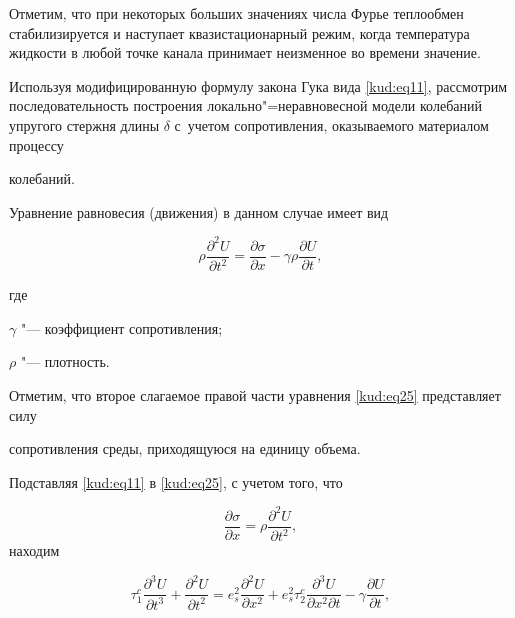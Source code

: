 Отметим, что при некоторых больших значениях числа Фурье теплообмен стабилизируется и наступает квазистационарный режим, когда температура жидкости в любой точке канала принимает неизменное во времени значение.





\smallskip




Используя модифицированную формулу закона Гука вида \eqref{kud:eq11}, рассмотрим последовательность построения локально"=неравновесной модели колебаний упругого стержня длины $\delta$ с~учетом сопротивления, оказываемого материалом процессу

колебаний. 

Уравнение равновесия (движения) в данном случае имеет вид

\begin{equation}

\label{kud:eq25}

\rho \frac{\partial ^2U}{\partial t^2}=\frac{\partial  \sigma}{\partial x}-\gamma\rho \frac{\partial U}{\partial t},

\end{equation}

где 

$ {\gamma }$ "--- коэффициент сопротивления;

$\rho $ "--- плотность.



Отметим, что второе слагаемое правой части уравнения \eqref{kud:eq25} представляет силу

сопротивления среды, приходящуюся на единицу объема.



Подставляя \eqref{kud:eq11} в \eqref{kud:eq25}, с учетом того, что 

$$ \frac{\partial  \sigma}{\partial x}= \rho \frac{\partial ^2U}{\partial t^2},$$ находим

\begin{equation}

\label{kud:eq26}

\tau_1^c \frac{\partial ^3U}{\partial t^3}+\frac{\partial

^2U}{\partial t^2}=e^2_s\frac{\partial ^2U}{\partial x^2}+e^2_s \tau_2^c

\frac{\partial ^3U}{\partial x^2\partial t}- \gamma \frac{\partial U}{\partial t},

\end{equation}

